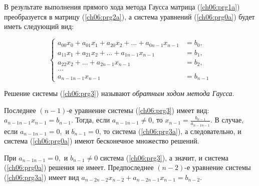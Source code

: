 В результате выполнения прямого хода метода Гаусса матрица (\ref{ch06:prg1a}) преобразуется в матрицу (\ref{ch06:prg2a}), а
система уравнений (\ref{ch06:prg0a}) будет иметь следующий вид:

\begin{equation}\label{ch06:prg3a}
\left\{\begin{array}{rl}
a_{00}x_0+a_{01}x_1+a_{20}x_2+...+a_{0n-1}x_{n-1}&=b_0,\\
a_{11}x_1+a_{21}x_2+...+a_{1n-1}x_{n-1}&=b_1,\\
a_{22}x_2+...+a_{2n-1}x_{n-1}&=b_2,\\
...\\
a_{n-1n-1}x_{n-1}&=b_{n-1}
\end{array}\right.
\end{equation}




Решение системы (\ref{ch06:prg3}) называют \emph{обратным ходом метода Гаусса}.

Последнее $(n-1)$-е уравнение системы (\ref{ch06:prg3}) имеет вид:
 $a_{n-1n-1}x_{n-1}=b_{n-1}$.
Тогда, если  $a_{n-1n-1}\neq 0$, то  $x_{n-1}=\frac{b_{n-1}}{a_{n-1n-1}}$. 
В случае, если  $a_{n-1n-1}=0,$ и $b_{n-1}=0$, то система (\ref{ch06:prg3a}), 
а следовательно, и система (\ref{ch06:prg0a}) имеют бесконечное множество
решений. 

При  $a_{n-1n-1}=0,$ и  $b_{n-1}\neq 0$  система (\ref{ch06:prg3}), а значит, и система (\ref{ch06:prg0a}) решения не
имеет.
Предпоследнее $(n-2)$-е уравнение системы (\ref{ch06:prg3a}) имеет вид
$a_{n-2n-2}x_{n-2}+a_{n-2n-1}x_{n-1}=b_{n-2}$.



